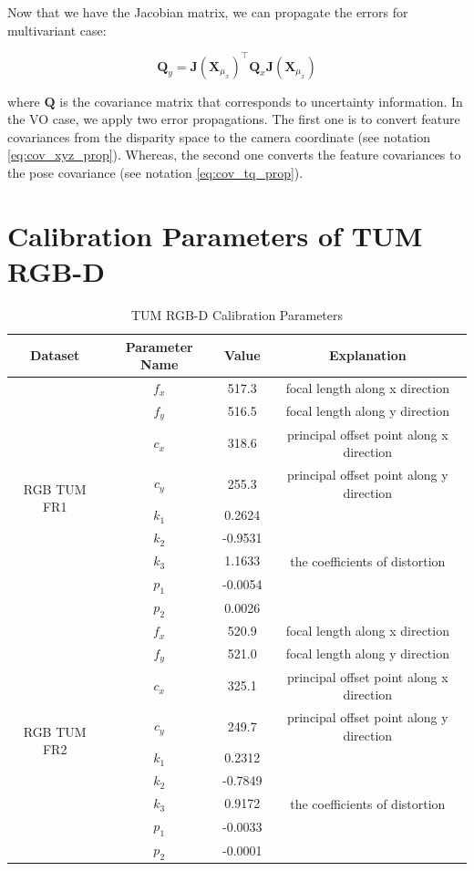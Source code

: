 \documentclass[a4paper]{report}
\numberwithin{figure}{section}
\begin{document}
\begin{appendices}
Now that we have the Jacobian matrix, we can propagate the errors for multivariant case:

\begin{equation}
  \mathbf{Q}_y = \mathbf{J}(\mathbf{X}_{\mu_x})^\top \mathbf{Q}_x 
  \mathbf{J}(\mathbf{X}_{\mu_x})
\end{equation}

where $\mathbf{Q}$ is the covariance matrix that corresponds to uncertainty information.
In the VO case, we apply two error propagations. The first one is to convert 
feature covariances from the disparity space to the camera coordinate 
(see notation \eqref{eq:cov_xyz_prop}). Whereas, the second one converts 
the feature covariances to the pose covariance (see notation 
\eqref{eq:cov_tq_prop}).

\section{Calibration Parameters of TUM RGB-D}

\begin{table}[H]
	\caption{TUM RGB-D Calibration Parameters}
	\centering
  \begin{tabular}{c|c|c|c}
    Dataset & Parameter Name & Value & Explanation\\
    \hline
    \multirow{9}{*}{RGB TUM FR1} & $f_x$ & 517.3 & focal length along x 
    direction\\
    & $f_y$ & 516.5 & focal length along y direction\\
    & $c_x$ & 318.6 & principal offset point along x direction\\
    & $c_y$ & 255.3 & principal offset point along y direction\\
    & $k_1$ & 0.2624 & \multirow{5}{*}{the coefficients of distortion}\\
    & $k_2$ & -0.9531 & \\
    & $k_3$ & 1.1633 & \\
    & $p_1$ & -0.0054 & \\
    & $p_2$ & 0.0026 & \\
    \hline
    \multirow{9}{*}{RGB TUM FR2} & $f_x$ & 520.9 & focal length along x 
    direction\\
    & $f_y$ & 521.0 & focal length along y direction\\
    & $c_x$ & 325.1 & principal offset point along x direction\\
    & $c_y$ & 249.7 & principal offset point along y direction\\
    & $k_1$ & 0.2312 & \multirow{5}{*}{the coefficients of distortion}\\
    & $k_2$ & -0.7849 & \\
    & $k_3$ & 0.9172 & \\
    & $p_1$ & -0.0033 & \\
    & $p_2$ & -0.0001 & \\
\end{tabular}	
\label{tb:tum_calib_param}
\end{table}



\end{appendices}
\end{document}
